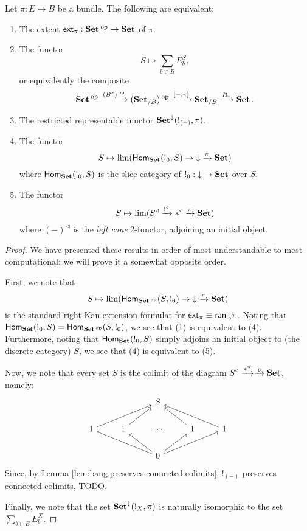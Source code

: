 \begin{prop}\label{prop:set.characterizing.extent}
  Let $\pi : E \to B$ be a bundle. The following are equivalent:
  \begin{enumerate}
  \item The extent $\operatorname{\mathsf{{ext}}}_{\pi} : \operatorname{\textbf{Set}}\operatorname{^\text{op}} \to \operatorname{\textbf{Set}}$ of $\pi$.
  \item The functor
    $$S \mapsto \sum_{b \in B} E_b^S,$$
    or equivalently the composite
  $$\operatorname{\textbf{Set}}\operatorname{^\text{op}} \xrightarrow{(B^{\ast})\operatorname{^\text{op}}} (\operatorname{\textbf{Set}}_{/B})\operatorname{^\text{op}} \xrightarrow{[-, \pi]} \operatorname{\textbf{Set}}_{/B}
  \xrightarrow{B_{\ast}} \operatorname{\textbf{Set}}.$$
\item The restricted representable functor
  $\operatorname{\textbf{Set}}^{\mathbin{\downarrow}}(!_{(-)}, \pi)$.
\item The functor
  $$S \mapsto \lim(\operatorname{\mathsf{Hom}}_{\operatorname{\textbf{Set}}}(!_0, S) \to \mathbin{\downarrow} \xrightarrow{\pi} \operatorname{\textbf{Set}})$$
  where $\operatorname{\mathsf{Hom}}_{\operatorname{\textbf{Set}}}(!_0, S)$ is the slice category of $!_0 : \mathbin{\downarrow} \to
  \operatorname{\textbf{Set}}$ over $S$.
\item The functor
  $$S \mapsto \lim(S^{\triangleleft} \xrightarrow{!^{\triangleleft}} \ast^{\triangleleft}
  \xrightarrow{\pi} \operatorname{\textbf{Set}})$$
  where $(-)^{\triangleleft}$ is the \emph{left cone} 2-functor, adjoining an initial object.
  \end{enumerate}
\end{prop}
\begin{proof}
We have presented these results in order of most understandable to most
computational; we will prove it a somewhat opposite order.

First, we note that 
$$S \mapsto \lim(\operatorname{\mathsf{Hom}}_{\operatorname{\textbf{Set}}\operatorname{^\text{op}}}(S, !_0) \to \mathbin{\downarrow} \xrightarrow{\pi} \operatorname{\textbf{Set}})$$
is the standard right Kan extension formulat for $\operatorname{\mathsf{{ext}}}_{\pi} \equiv
\mathsf{{ran}}_{!_0} \pi$. Noting that $\operatorname{\mathsf{Hom}}_{\operatorname{\textbf{Set}}}(!_0, S) = \operatorname{\mathsf{Hom}}_{\operatorname{\textbf{Set}}\operatorname{^\text{op}}}(S,
!_0)$, we see that (1) is equivalent to (4). Furthermore, noting that
$\operatorname{\mathsf{Hom}}_{\operatorname{\textbf{Set}}}(!_0, S)$ simply adjoins an initial object to (the discrete
category) $S$, we see that (4) is equivalent to (5).

Now, we note that every set $S$ is the colimit of the diagram $S^{\triangleleft}
\xrightarrow{\ast^{\triangleleft}} \xrightarrow{!_0} \operatorname{\textbf{Set}}$, namely:
\[
\begin{tikzcd}
              &              & S                                               &              &               \\
1 \arrow[rru] & 1 \arrow[ru] & \cdots                                          & 1 \arrow[lu] & 1 \arrow[llu] \\
              &              & 0 \arrow[llu] \arrow[lu] \arrow[ru] \arrow[rru] &              &              
\end{tikzcd}
\]
Since, by Lemma \ref{lem:bang.preserves.connected.colimits}, $!_{(-)}$
preserves connected colimits, {\color{red} TODO}.

Finally, we note that the set $\operatorname{\textbf{Set}}^{\mathbin{\downarrow}}(!_X, \pi)$ is naturally
isomorphic to the set $\sum_{b \in B} E_b^X$.
\end{proof}

